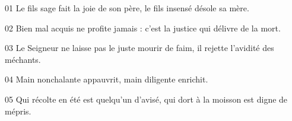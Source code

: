 01 Le fils sage fait la joie de son père, le fils insensé désole sa mère.

02 Bien mal acquis ne profite jamais : c’est la justice qui délivre de la mort.

03 Le Seigneur ne laisse pas le juste mourir de faim, il rejette l’avidité des méchants.

04 Main nonchalante appauvrit, main diligente enrichit.

05 Qui récolte en été est quelqu’un d’avisé, qui dort à la moisson est digne de mépris.
